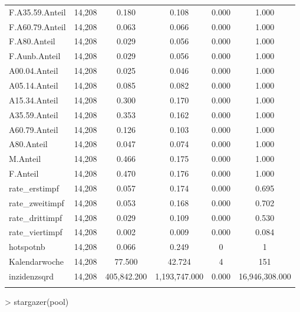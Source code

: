 \documentclass{article}
\begin{document}
\begin{table}[!htbp]
\begin{tabular}{@{\extracolsep{5pt}}lccccc}
F.A35.59.Anteil & 14,208 & 0.180 & 0.108 & 0.000 & 1.000 \\ 
F.A60.79.Anteil & 14,208 & 0.063 & 0.066 & 0.000 & 1.000 \\ 
F.A80.Anteil & 14,208 & 0.029 & 0.056 & 0.000 & 1.000 \\ 
F.Aunb.Anteil & 14,208 & 0.029 & 0.056 & 0.000 & 1.000 \\ 
A00.04.Anteil & 14,208 & 0.025 & 0.046 & 0.000 & 1.000 \\ 
A05.14.Anteil & 14,208 & 0.085 & 0.082 & 0.000 & 1.000 \\ 
A15.34.Anteil & 14,208 & 0.300 & 0.170 & 0.000 & 1.000 \\ 
A35.59.Anteil & 14,208 & 0.353 & 0.162 & 0.000 & 1.000 \\ 
A60.79.Anteil & 14,208 & 0.126 & 0.103 & 0.000 & 1.000 \\ 
A80.Anteil & 14,208 & 0.047 & 0.074 & 0.000 & 1.000 \\ 
M.Anteil & 14,208 & 0.466 & 0.175 & 0.000 & 1.000 \\ 
F.Anteil & 14,208 & 0.470 & 0.176 & 0.000 & 1.000 \\ 
rate\_erstimpf & 14,208 & 0.057 & 0.174 & 0.000 & 0.695 \\ 
rate\_zweitimpf & 14,208 & 0.053 & 0.168 & 0.000 & 0.702 \\ 
rate\_drittimpf & 14,208 & 0.029 & 0.109 & 0.000 & 0.530 \\ 
rate\_viertimpf & 14,208 & 0.002 & 0.009 & 0.000 & 0.084 \\ 
hotspotnb & 14,208 & 0.066 & 0.249 & 0 & 1 \\ 
Kalendarwoche & 14,208 & 77.500 & 42.724 & 4 & 151 \\ 
inzidenzsqrd & 14,208 & 405,842.200 & 1,193,747.000 & 0.000 & 16,946,308.000 \\ 
\hline \\[-1.8ex] 
\end{tabular} 
\end{table} 
> stargazer(pool)
\end{document}
